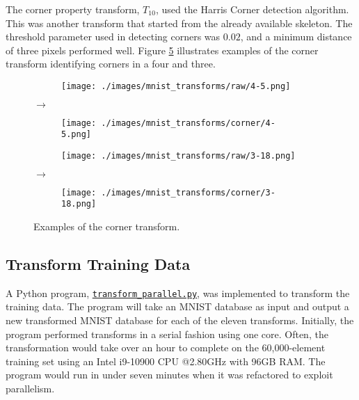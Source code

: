 The corner property transform, $T_{10}$, used the Harris Corner detection
algorithm. This was another transform that started from the already available
skeleton. The threshold parameter used in detecting corners was $0.02$, and a
minimum distance of three pixels performed well. Figure
\ref{fig:corner_examples} illustrates examples of the corner transform
identifying corners in a four and three.

\begin{figure}[H]
    \centering

    \begin{subfigure}{.15\columnwidth}
        \centering
        \texttt{[image: ./images/mnist\_transforms/raw/4-5.png]}
        \caption{}
        \label{fig:corner_orig1}
    \end{subfigure}%
    $\rightarrow$
    \begin{subfigure}{.15\columnwidth}
        \centering
        \texttt{[image: ./images/mnist\_transforms/corner/4-5.png]}
        \caption{}
        \label{fig:corner_transform1}
    \end{subfigure}

    \par\medskip

    \begin{subfigure}{.15\columnwidth}
        \centering
        \texttt{[image: ./images/mnist\_transforms/raw/3-18.png]}
        \caption{}
        \label{fig:corner_orig2}
    \end{subfigure}%
    $\rightarrow$
    \begin{subfigure}{.15\columnwidth}
        \centering
        \texttt{[image: ./images/mnist\_transforms/corner/3-18.png]}
        \caption{}
        \label{fig:corner_transform2}
    \end{subfigure}

    \caption{Examples of the corner transform.}
    \label{fig:corner_examples}
\end{figure}

\subsection{Transform Training Data}

A Python program,
\href{https://gitlab.com/paulwhitten/2023-svm-xai/-/blob/main/transform_parallel.py}{\texttt{transform\_parallel.py}}\cite{whitten2024icmi_source},
was implemented to transform the training data.  The program will take an MNIST
database as input and output a new transformed MNIST database for each of the
eleven transforms. Initially, the program performed transforms in a serial
fashion using one core. Often, the transformation would take over an hour to
complete on the 60,000-element training set using an Intel i9-10900 CPU @2.80GHz
with 96GB RAM. The program would run in under seven minutes when it was
refactored to exploit parallelism.

